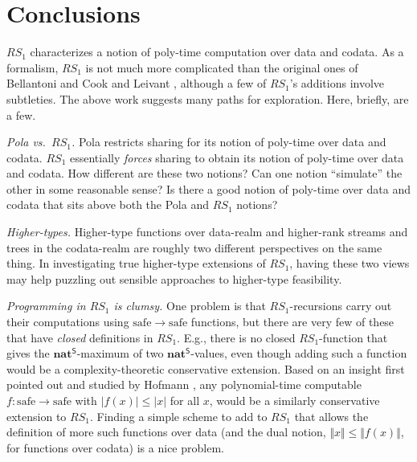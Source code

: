 \documentclass[envcountsame]{llncs}
\newcommand{\safe}[1]{#1^{\mathsf{S}}}
\newcommand{\type}[1]{\ensuremath{\mathbf{#1}}\xspace}
\newcommand{\Nat}{\type{nat}}
\newcommand{\asize}[1]{\ensuremath{\mathopen{|}#1\mathclose{|}}\xspace}
\newcommand{\osize}[1]{\ensuremath{\mathopen{\Vert}#1\mathclose{\Vert}}}
\newcommand{\RSi}{\mathit{RS_1}}
\newcommand{\of}{\colon}
\renewcommand{\colon}{\mathpunct{:}}
\begin{document}
\section{Conclusions}\label{S:fini}

$\RSi$ characterizes a notion of poly-time computation over data 
and codata. As a formalism, $\RSi$ is not much more complicated  
than  the original ones of Bellantoni and Cook
\cite{BellantoniCook} and Leivant \cite{Leivant:FM2}, although
a few of  $\RSi$'s additions involve  subtleties.  
The above work suggests many paths for exploration.
Here, briefly, are a few.



\emph{Pola vs.~$\RSi$.}
Pola restricts sharing for its notion of poly-time
over data and codata. $\RSi$ essentially \emph{forces} sharing 
to obtain its notion of poly-time over data and codata. 
How different are these two notions?  Can one notion
``simulate'' the other in some reasonable sense?  Is there
a good notion of poly-time over data and codata that sits above
both the Pola and $\RSi$ notions?


\emph{Higher-types.} Higher-type functions over data-realm and higher-rank streams and
trees in the codata-realm are roughly two different perspectives 
on the same thing.  In investigating true higher-type
extensions of $\RSi$, having these two views may help puzzling out
sensible approaches to higher-type feasibility. 



\emph{Programming in $\RSi$ is clumsy.}  
One problem is that  $\RSi$-recursions carry out their computations 
using $\mathrm{safe}\to\mathrm{safe}$ functions, but there are very few
of these that have \emph{closed} definitions in $\RSi$. E.g.,
there is no closed $\RSi$-function that gives the
$\safe\Nat$-maximum of two $\safe\Nat$-values, even though adding
such a function would be a complexity-theoretic conservative 
extension.
Based on an insight first pointed out and studied by
Hofmann \cite{Hofmann03}, any polynomial-time computable
$f\of\mathrm{safe}\to\mathrm{safe}$ with $\asize{f(x)}\leq
\asize{x}$ for all $x$, would be a similarly conservative extension to
$\RSi$.  Finding a simple scheme to add to $\RSi$ that allows the definition
of more such functions over data (and the dual notion,
$\osize{x}\leq \osize{f(x)}$, for functions over codata) is a nice
problem.



                

\end{document}
